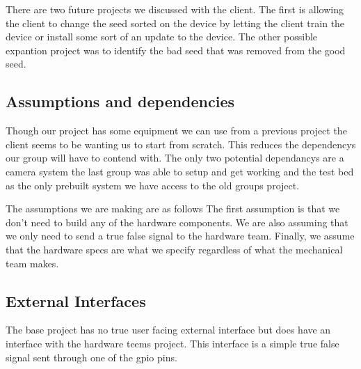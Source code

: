 \documentclass[onecolumn, draftclsnofoot,10pt, compsoc]{IEEEtran}
\begin{document}
There are two future projects we discussed with the client.
The first is allowing the client to change the seed sorted on the device by letting the client train the device or install some sort of an update to the device.
The other possible expantion project was to identify the bad seed that was removed from the good seed.

\subsection{Assumptions and dependencies}
Though our project has some equipment we can use from a previous project the client seems to be wanting us to start from scratch.
This reduces the dependencys our group will have to contend with.
The only two potential dependancys are a camera system the last group was able to setup and get working and the test bed as the only prebuilt system we have access to the old groups project.

The assumptions we are making are as follows
The first assumption is that we don’t need to build any of the hardware components.
We are also assuming that we only need to send a true false signal to the hardware team.
Finally, we assume that the hardware specs are what we specify regardless of what the mechanical team makes.

\subsection{External Interfaces}
The base project has no true user facing external interface but does have an interface with the hardware teems project.
This interface is a simple true false signal sent through one of the gpio pins.
\end{document}
